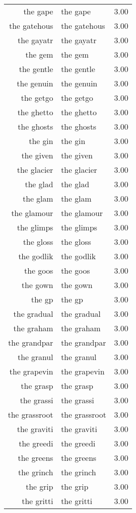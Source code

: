 \begin{table}[ht]
\begin{tabular}{rlr}
  the gape & the gape & 3.00 \\ 
  the gatehous & the gatehous & 3.00 \\ 
  the gayatr & the gayatr & 3.00 \\ 
  the gem & the gem & 3.00 \\ 
  the gentle & the gentle & 3.00 \\ 
  the genuin & the genuin & 3.00 \\ 
  the getgo & the getgo & 3.00 \\ 
  the ghetto & the ghetto & 3.00 \\ 
  the ghosts & the ghosts & 3.00 \\ 
  the gin & the gin & 3.00 \\ 
  the given & the given & 3.00 \\ 
  the glacier & the glacier & 3.00 \\ 
  the glad & the glad & 3.00 \\ 
  the glam & the glam & 3.00 \\ 
  the glamour & the glamour & 3.00 \\ 
  the glimps & the glimps & 3.00 \\ 
  the gloss & the gloss & 3.00 \\ 
  the godlik & the godlik & 3.00 \\ 
  the goos & the goos & 3.00 \\ 
  the gown & the gown & 3.00 \\ 
  the gp & the gp & 3.00 \\ 
  the gradual & the gradual & 3.00 \\ 
  the graham & the graham & 3.00 \\ 
  the grandpar & the grandpar & 3.00 \\ 
  the granul & the granul & 3.00 \\ 
  the grapevin & the grapevin & 3.00 \\ 
  the grasp & the grasp & 3.00 \\ 
  the grassi & the grassi & 3.00 \\ 
  the grassroot & the grassroot & 3.00 \\ 
  the graviti & the graviti & 3.00 \\ 
  the greedi & the greedi & 3.00 \\ 
  the greens & the greens & 3.00 \\ 
  the grinch & the grinch & 3.00 \\ 
  the grip & the grip & 3.00 \\ 
  the gritti & the gritti & 3.00 \\ 

\end{tabular}
\end{table}
